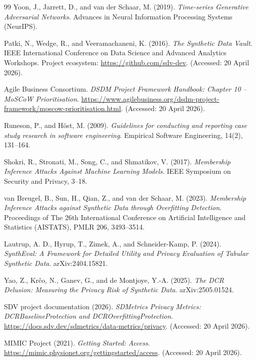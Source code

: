 \documentclass[11pt]{informatics-report}
\begin{document}
\begin{thebibliography}{99}
Yoon, J., Jarrett, D., and van der Schaar, M. (2019).
\textit{Time-series Generative Adversarial Networks}.
Advances in Neural Information Processing Systems (NeurIPS).

Patki, N., Wedge, R., and Veeramachaneni, K. (2016).
\textit{The Synthetic Data Vault}.
IEEE International Conference on Data Science and Advanced Analytics Workshops.
\newline
Project ecosystem: \url{https://github.com/sdv-dev}.
(Accessed: 20 April 2026).

Agile Business Consortium.
\textit{DSDM Project Framework Handbook: Chapter 10 -- MoSCoW Prioritisation}.
\url{https://www.agilebusiness.org/dsdm-project-framework/moscow-prioritisation.html}.
(Accessed: 20 April 2026).

Runeson, P., and H{\"o}st, M. (2009).
\textit{Guidelines for conducting and reporting case study research in software engineering}.
Empirical Software Engineering, 14(2), 131--164.

Shokri, R., Stronati, M., Song, C., and Shmatikov, V. (2017).
\textit{Membership Inference Attacks Against Machine Learning Models}.
IEEE Symposium on Security and Privacy, 3--18.

van Breugel, B., Sun, H., Qian, Z., and van der Schaar, M. (2023).
\textit{Membership Inference Attacks against Synthetic Data through Overfitting Detection}.
Proceedings of The 26th International Conference on Artificial Intelligence and Statistics (AISTATS), PMLR 206, 3493--3514.

Lautrup, A. D., Hyrup, T., Zimek, A., and Schneider-Kamp, P. (2024).
\textit{SynthEval: A Framework for Detailed Utility and Privacy Evaluation of Tabular Synthetic Data}.
arXiv:2404.15821.

Yao, Z., Kr{\v{c}}o, N., Ganev, G., and de Montjoye, Y.-A. (2025).
\textit{The DCR Delusion: Measuring the Privacy Risk of Synthetic Data}.
arXiv:2505.01524.

SDV project documentation (2026).
\textit{SDMetrics Privacy Metrics: DCRBaselineProtection and DCROverfittingProtection}.
\url{https://docs.sdv.dev/sdmetrics/data-metrics/privacy}.
(Accessed: 20 April 2026).

MIMIC Project (2021).
\textit{Getting Started: Access}.
\url{https://mimic.physionet.org/gettingstarted/access}.
(Accessed: 20 April 2026).


\end{thebibliography}
\end{document}
